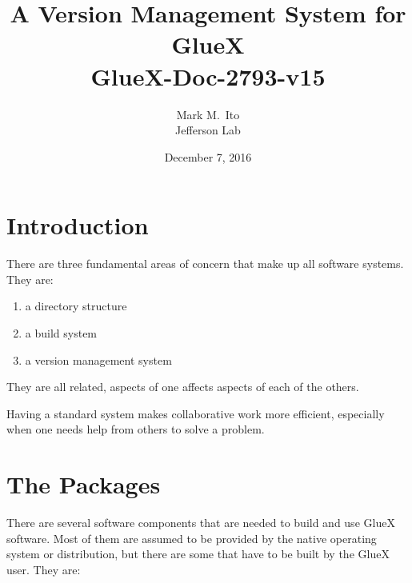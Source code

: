 \documentclass[12pt]{article}
\title{A Version Management System for GlueX \\ \medskip \large
  GlueX-Doc-2793-v15}
\author{Mark M.\ Ito \\ Jefferson Lab}
\date{December 7, 2016}
\begin{document}
\maketitle


\tableofcontents

\section{Introduction}
There are three fundamental areas of concern that make up all software
systems. They are:

\begin{enumerate}
\item a directory structure
\item a build system
\item a version management system
\end{enumerate}

They are all related, aspects of one affects aspects of each of the others.

Having a standard system makes collaborative work more efficient,
especially when one needs help from others to solve a problem.

\section{The Packages}

There are several software components that are needed to build and use
GlueX software. Most of them are assumed to be provided by the native
operating system or distribution, but there are some that have to be
built by the GlueX user. They are:
\end{document}
